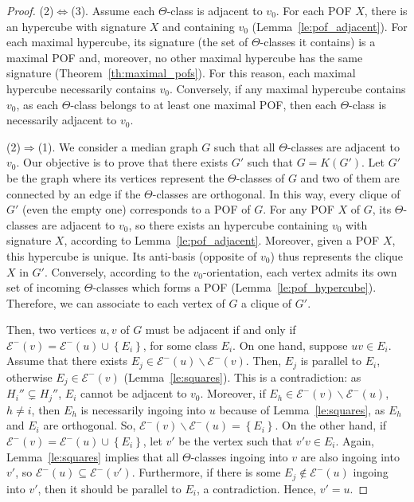 \documentclass[a4paper,UKenglish,numberwithinsect,cleveref, autoref,anonymous]{lipics-v2021}
\newcommand{\set}[1]{\left\{ #1 \right\}}
\begin{document}
\begin{proof}
(2)$\Leftrightarrow$(3). Assume each $\Theta$-class is adjacent to $v_0$. For each POF $X$, there is an hypercube with signature $X$ and containing $v_0$ (Lemma~\ref{le:pof_adjacent}). For each maximal hypercube, its signature (the set of $\Theta$-classes it contains) is a maximal POF and, moreover, no other maximal hypercube has the same signature (Theorem~\ref{th:maximal_pofs}). For this reason, each maximal hypercube necessarily contains $v_0$. 
Conversely, if any maximal hypercube contains $v_0$, as each $\Theta$-class belongs to at least one maximal POF, then each $\Theta$-class is necessarily adjacent to $v_0$.

(2)$\Rightarrow$(1). We consider a median graph $G$ such that all $\Theta$-classes are adjacent to $v_0$. Our objective is to prove that there exists $G'$ such that $G = K(G')$. Let $G'$ be the graph where its vertices represent the $\Theta$-classes of $G$ and two of them are connected by an edge if the $\Theta$-classes are orthogonal. In this way, every clique of $G'$ (even the empty one) corresponds to a POF of $G$. For any POF $X$ of $G$, its $\Theta$-classes are adjacent to $v_0$, so there exists an hypercube containing $v_0$ with signature $X$, according to Lemma~\ref{le:pof_adjacent}. Moreover, given a POF $X$, this hypercube is unique. Its anti-basis (opposite of $v_0$) thus represents the clique $X$ in $G'$. Conversely, according to the $v_0$-orientation, each vertex admits its own set of incoming $\Theta$-classes which forms a POF (Lemma~\ref{le:pof_hypercube}). Therefore, we can associate to each vertex of $G$ a clique of $G'$. 

Then, two vertices $u,v$ of $G$ must be adjacent if and only if $\mathcal{E}^-(v) = \mathcal{E}^-(u) \cup \set{E_i}$, for some class $E_i$. On one hand, suppose $uv \in E_i$. Assume that there exists $E_j \in \mathcal{E}^-(u) \backslash \mathcal{E}^-(v)$. Then, $E_j$ is parallel to $E_i$, otherwise $E_j \in \mathcal{E}^-(v)$ (Lemma~\ref{le:squares}). This is a contradiction: as $H_i'' \subsetneq H_j''$, $E_i$ cannot be adjacent to $v_0$. Moreover, if $E_h \in \mathcal{E}^-(v) \backslash \mathcal{E}^-(u)$, $h \neq i$, then $E_h$ is necessarily ingoing into $u$ because of Lemma~\ref{le:squares}, as $E_h$ and $E_i$ are orthogonal. So, $\mathcal{E}^-(v) \backslash \mathcal{E}^-(u) = \set{E_i}$. On the other hand, if $\mathcal{E}^-(v) = \mathcal{E}^-(u) \cup \set{E_i}$, let $v'$ be the vertex such that $v'v \in E_i$. Again, Lemma~\ref{le:squares} implies that all $\Theta$-classes ingoing into $v$ are also ingoing into $v'$, so $\mathcal{E}^-(u) \subseteq \mathcal{E}^-(v')$. Furthermore, if there is some $E_j \notin \mathcal{E}^-(u)$ ingoing into $v'$, then it should be parallel to $E_i$, a contradiction. Hence, $v' = u$.


\end{proof}
\end{document}
